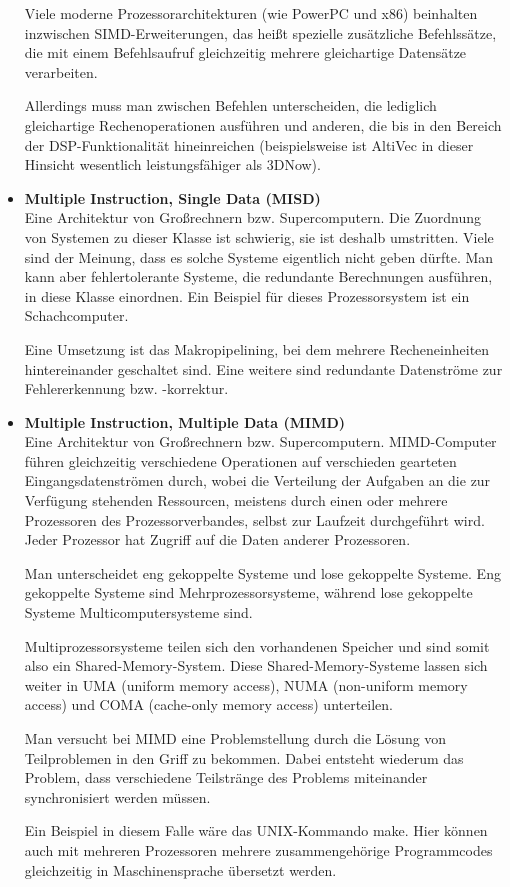 \begin{itemize}
Viele moderne Prozessorarchitekturen (wie PowerPC und x86) beinhalten inzwischen SIMD-Erweiterungen, das heißt spezielle zusätzliche Befehlssätze, die mit einem Befehlsaufruf gleichzeitig mehrere gleichartige Datensätze verarbeiten.

Allerdings muss man zwischen Befehlen unterscheiden, die lediglich gleichartige Rechenoperationen ausführen und anderen, die bis in den Bereich der DSP-Funktionalität hineinreichen (beispielsweise ist AltiVec in dieser Hinsicht wesentlich leistungsfähiger als 3DNow). 

    \item \textbf{Multiple Instruction, Single Data (MISD)}\\ Eine Architektur von Großrechnern bzw. Supercomputern. Die Zuordnung von Systemen zu dieser Klasse ist schwierig, sie ist deshalb umstritten. Viele sind der Meinung, dass es solche Systeme eigentlich nicht geben dürfte. Man kann aber fehlertolerante Systeme, die redundante Berechnungen ausführen, in diese Klasse einordnen. Ein Beispiel für dieses Prozessorsystem ist ein Schachcomputer.

Eine Umsetzung ist das Makropipelining, bei dem mehrere Recheneinheiten hintereinander geschaltet sind. Eine weitere sind redundante Datenströme zur Fehlererkennung bzw. -korrektur. 

    \item \textbf{Multiple Instruction, Multiple Data (MIMD)}\\ Eine Architektur von Großrechnern bzw. Supercomputern. MIMD-Computer führen gleichzeitig verschiedene Operationen auf verschieden gearteten Eingangsdatenströmen durch, wobei die Verteilung der Aufgaben an die zur Verfügung stehenden Ressourcen, meistens durch einen oder mehrere Prozessoren des Prozessorverbandes, selbst zur Laufzeit durchgeführt wird. Jeder Prozessor hat Zugriff auf die Daten anderer Prozessoren.

Man unterscheidet eng gekoppelte Systeme und lose gekoppelte Systeme. Eng gekoppelte Systeme sind Mehrprozessorsysteme, während lose gekoppelte Systeme Multicomputersysteme sind.

Multiprozessorsysteme teilen sich den vorhandenen Speicher und sind somit also ein Shared-Memory-System. Diese Shared-Memory-Systeme lassen sich weiter in UMA (uniform memory access), NUMA (non-uniform memory access) und COMA (cache-only memory access) unterteilen.

Man versucht bei MIMD eine Problemstellung durch die Lösung von Teilproblemen in den Griff zu bekommen. Dabei entsteht wiederum das Problem, dass verschiedene Teilstränge des Problems miteinander synchronisiert werden müssen.

Ein Beispiel in diesem Falle wäre das UNIX-Kommando make. Hier können auch mit mehreren Prozessoren mehrere zusammengehörige Programmcodes gleichzeitig in Maschinensprache übersetzt werden. 
        \end{itemize}
        
